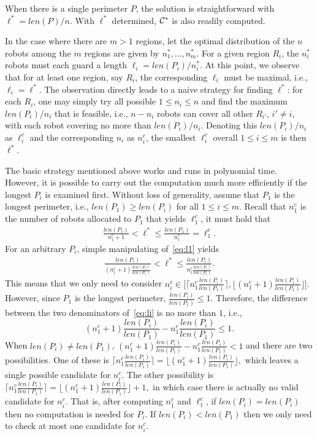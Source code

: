 When there is a single perimeter $P$, the solution is straightforward 
with $\ell^* = len(P)/n$. With $\ell^*$ determined, $\mathcal C^*$ is also readily computed. 

In the case where there are $m > 1$ regions, let the optimal 
distribution of the $n$ robots among the $m$ regions are given by 
$n_1^*, \ldots, n_m^*$. For a given region $R_i$, the $n_i^*$ robots 
must each guard a length $\ell_i = len(P_i)/n_i^*$. At this point, we
observe that for at least one region, say $R_i$, 
the corresponding $\ell_i$ must be maximal, i.e., $\ell_i = \ell^*$. 
The observation directly leads to a naive strategy for finding $\ell^*$: 
for each $R_i$, one may simply try all possible $1 \le n_i \le n$ and 
find the maximum $len(P_i)/n_i$ that is feasible, i.e., $n - n_i$ robots
can cover all other $R_{i'}$, $i' \ne i$, with each robot covering no 
more than $len(P_i)/n_i$. Denoting this $len(P_i)/n_i$ as $\ell_i^c$ and 
the corresponding $n_i$ as $n_i^c$, the smallest $\ell_i^c$ overall $1 
\le i \le m$ is then $\ell^*$.

The basic strategy mentioned above works and runs in polynomial time. 
However, it is possible to carry out the computation much more 
efficiently if the longest $P_i$ is examined first. Without loss of 
generality, assume that $P_1$ is the longest perimeter, i.e., $len(P_1)
\ge len(P_{i})$ for all $1 \le i \le m$. Recall that $n_1^c$ is the 
number of robots allocated to $P_1$ that yields $\ell_1^c$, it must hold 
that 
\begin{align}\label{eq:l1}
\frac{len(P_1)}{n_1^c + 1} < \ell^* \le \frac{len(P_1)}{n_1^c} = \ell_1^c .
\end{align}
For an arbitrary $P_i$, simple manipulating of~\eqref{eq:l1} yields
\begin{align}\label{eq:li}
\frac{len(P_i)}{(n_1^c + 1)\frac{len(P_i)}{len(P_1)}} < \ell^* \le 
\frac{len(P_i)}{n_1^c\frac{len(P_i)}{len(P_1)}}.
\end{align}
This means that we only need to consider
$
n_i^c \in 
\big[\lceil n_1^c\frac{len(P_i)}{len(P_1)} \rceil, 
\lfloor (n_1^c + 1)\frac{len(P_i)}{len(P_1)}\rfloor].
$
However, since $P_1$ is the longest perimeter, $\frac{len(P_i)}{len(P_1)} 
\le 1$. Therefore, the difference between the two denominators 
of~\eqref{eq:li} is no more than $1$, i.e., 
\[
(n_1^c + 1)\frac{len(P_i)}{len(P_1)} - n_1^c\frac{len(P_i)}{len(P_1)} \le 1. 
\]
When $len(P_i) \ne len(P_1)$, $(n_1^c + 1)\frac{len(P_i)}{len(P_1)} 
- n_1^c\frac{len(P_i)}{len(P_1)} < 1$ and there are two possibilities. One 
of these is 
$
\lceil n_1^c\frac{len(P_i)}{len(P_1)} \rceil =
\lfloor (n_1^c + 1)\frac{len(P_i)}{len(P_1)}\rfloor,
$
which leaves a single possible candidate for $n_i^c$. The other 
possibility 
is 
$
\lceil n_1^c\frac{len(P_i)}{len(P_1)} \rceil =
\lfloor (n_1^c + 1)\frac{len(P_i)}{len(P_1)}\rfloor + 1,
$
in which case there is actually no valid candidate for $n_i^c$. 
That is, after computing $n_1^c$ and $\ell_1^c$, if $len(P_i) = len(P_i)$ 
then no computation is needed for $P_i$. If $len(P_i) < len(P_1)$ then we 
only need to check at most one candidate for $n_i^c$. 

